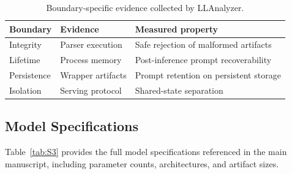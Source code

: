 \begin{table}[!t]
\centering
\small
\caption{Boundary-specific evidence collected by LLAnalyzer.}
\label{tab:S2}
\begin{tabular}{p{1.6cm}p{2.2cm}p{3.1cm}}
\toprule
\textbf{Boundary} & \textbf{Evidence} & \textbf{Measured property} \\
\midrule
Integrity &
Parser execution &
Safe rejection of malformed artifacts \\

Lifetime &
Process memory &
Post-inference prompt recoverability \\

Persistence &
Wrapper artifacts &
Prompt retention on persistent storage \\

Isolation &
Serving protocol &
Shared-state separation \\
\bottomrule
\end{tabular}
\end{table}

\subsection{Model Specifications}
\label{app:model_specs}

Table~\ref{tab:S3} provides the full model specifications referenced
in the main manuscript, including parameter counts, architectures, and
artifact sizes.

\begin{table}[!th]
    \centering
    \caption{Open-weight models evaluated by LLAnalyzer. All model 
    artifacts use GGUF Q4\_K\_M quantisation and were obtained from the 
    \texttt{lmstudio-community} organization on Hugging Face.}
    \label{tab:S3}
\end{table}

